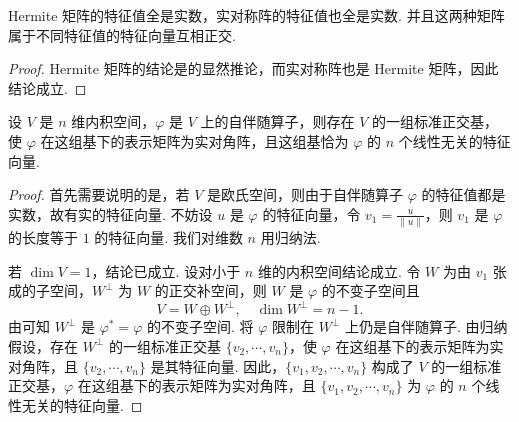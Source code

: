 \documentclass[../../main.tex]{subfiles}%
\begin{document}
\begin{corollary}\label{corollary:Hermite矩阵和实对称矩阵关于特征值的相关性质}
Hermite 矩阵的特征值全是实数，实对称阵的特征值也全是实数. 并且这两种矩阵属于不同特征值的特征向量互相正交.
\end{corollary}
\begin{proof}

Hermite 矩阵的结论是的显然推论，而实对称阵也是 Hermite 矩阵，因此结论成立.

\end{proof}

\begin{theorem}\label{theorem:关于自伴随算子正交对角化}
设 $V$ 是 $n$ 维内积空间，$\varphi$ 是 $V$ 上的自伴随算子，则存在 $V$ 的一组标准正交基，使 $\varphi$ 在这组基下的表示矩阵为实对角阵，且这组基恰为 $\varphi$ 的 $n$ 个线性无关的特征向量.
\end{theorem}
\begin{proof}

首先需要说明的是，若 $V$ 是欧氏空间，则由于自伴随算子 $\varphi$ 的特征值都是实数，故有实的特征向量. 不妨设 $u$ 是 $\varphi$ 的特征向量，令 $v_1 = \frac{u}{\|u\|}$，则 $v_1$ 是 $\varphi$ 的长度等于 $1$ 的特征向量. 我们对维数 $n$ 用归纳法.

若 $\dim V = 1$，结论已成立. 设对小于 $n$ 维的内积空间结论成立. 令 $W$ 为由 $v_1$ 张成的子空间，$W^\perp$ 为 $W$ 的正交补空间，则 $W$ 是 $\varphi$ 的不变子空间且
\[
V = W \oplus W^\perp, \quad \dim W^\perp = n - 1.
\]
由可知 $W^\perp$ 是 $\varphi^* = \varphi$ 的不变子空间. 将 $\varphi$ 限制在 $W^\perp$ 上仍是自伴随算子. 由归纳假设，存在 $W^\perp$ 的一组标准正交基 $\{v_2,\cdots,v_n\}$，使 $\varphi$ 在这组基下的表示矩阵为实对角阵，且 $\{v_2,\cdots,v_n\}$ 是其特征向量. 因此，$\{v_1,v_2,\cdots,v_n\}$ 构成了 $V$ 的一组标准正交基，$\varphi$ 在这组基下的表示矩阵为实对角阵，且 $\{v_1,v_2,\cdots,v_n\}$ 为 $\varphi$ 的 $n$ 个线性无关的特征向量.

\end{proof}
\end{document}
